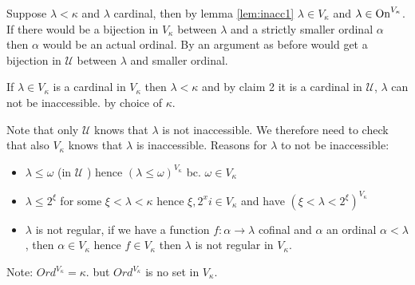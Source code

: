 {\begin{claimproof}
        Suppose $\lambda<\kappa$ and $\lambda$ cardinal, then by lemma \ref{lem:inacc1} $\lambda\in V_\kappa$ and $\lambda\in \operatorname{On}^{V_\kappa}$.
        If there would be a bijection in $V_\kappa$ between $\lambda$ and a strictly smaller ordinal 
        $\alpha$ then $\alpha$ would be an actual ordinal. By an argument as before would get a bijection in 
        $\mathcal{U}$ between $\lambda$ and smaller ordinal.
    \end{claimproof}
    If $\lambda\in V_\kappa$ is a cardinal in $V_\kappa$ then $\lambda<\kappa$ and by claim 2 it is a cardinal in $\mathcal{U}$, $\lambda$ can not be inaccessible. by choice of $\kappa$.

    Note that only $\mathcal{U}$ knows that $\lambda$ is not inaccessible. We therefore need to check that also $V_\kappa$ knows that $\lambda$ is inaccessible.
    Reasons for $\lambda$ to not be inaccessible:
    \begin{itemize}
        \item $\lambda\leq \omega$ (in $\mathcal{U}$ ) hence $(\lambda\leq \omega)^{V_\kappa}$ bc. $\omega\in V_\kappa$
        \item $\lambda\leq 2^\xi$ for some $\xi <\lambda<\kappa$ hence
        $\xi,2^xi\in V_\kappa$ and have $(\xi<\lambda<2^\xi)^{V_\kappa}$
        \item $\lambda$ is not regular, if we have a function $f:\alpha\to \lambda$ cofinal and $\alpha$ an ordinal $\alpha<\lambda$, then $\alpha\in V_\kappa$ hence $f\in V_\kappa$ then $\lambda$ is not regular in $V_\kappa$.
    \end{itemize}
}

Note: $Ord^{V_\kappa}=\kappa$. but $Ord^{V_\kappa}$ is no set in $V_\kappa$.
